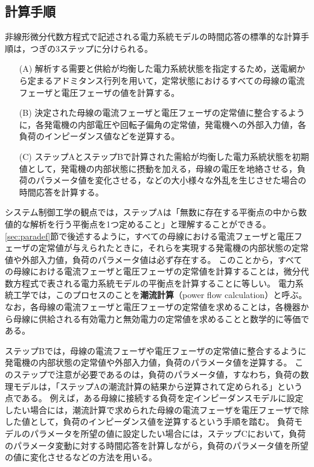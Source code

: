 \documentclass[tombow,dvipdfmx]{corona-a5-1.1}
\begin{document}
\subsection{計算手順}\label{sec:numstep}

非線形微分代数方程式で記述される電力系統モデルの時間応答の標準的な計算手順は，つぎの3ステップに分けられる。

\begin{itemize}
\item[(A)] 解析する需要と供給が均衡した電力系統状態を指定するため，送電網から定まるアドミタンス行列を用いて，定常状態におけるすべての母線の電流フェーザと電圧フェーザの値を計算する。
\item[(B)] 決定された母線の電流フェーザと電圧フェーザの定常値に整合するように，各発電機の内部電圧や回転子偏角の定常値，発電機への外部入力値，各負荷のインピーダンス値などを逆算する。
\item[(C)] ステップAとステップBで計算された需給が均衡した電力系統状態を初期値として，発電機の内部状態に摂動を加える，母線の電圧を地絡させる，負荷のパラメータ値を変化させる，などの大小様々な外乱を生じさせた場合の時間応答を計算する。
\end{itemize}

システム制御工学の観点では，ステップAは「無数に存在する平衡点の中から数値的な解析を行う平衡点を1つ定めること」と理解することができる。
\ref{sec:paradef}節で後述するように，すべての母線における電流フェーザと電圧フェーザの定常値が与えられたときに，それらを実現する発電機の内部状態の定常値や外部入力値，負荷のパラメータ値は必ず存在する。
このことから，すべての母線における電流フェーザと電圧フェーザの定常値を計算することは，微分代数方程式で表される電力系統モデルの平衡点を計算することに等しい。
電力系統工学では，このプロセスのことを\textbf{潮流計算}（power flow calculation）と呼ぶ。
なお，各母線の電流フェーザと電圧フェーザの定常値を求めることは，各機器から母線に供給される有効電力と無効電力の定常値を求めることと数学的に等価である。

ステップBでは，母線の電流フェーザや電圧フェーザの定常値に整合するように発電機の内部状態の定常値や外部入力値，負荷のパラメータ値を逆算する。
このステップで注意が必要であるのは，負荷のパラメータ値，すなわち，負荷の数理モデルは，「ステップAの潮流計算の結果から逆算されて定められる」という点である。
例えば，ある母線に接続する負荷を定インピーダンスモデルに設定したい場合には，潮流計算で求められた母線の電流フェーザを電圧フェーザで除した値として，負荷のインピーダンス値を逆算するという手順を踏む。
負荷モデルのパラメータを所望の値に設定したい場合には，ステップCにおいて，負荷のパラメータ変動に対する時間応答を計算しながら，負荷のパラメータ値を所望の値に変化させるなどの方法を用いる。
\end{document}
